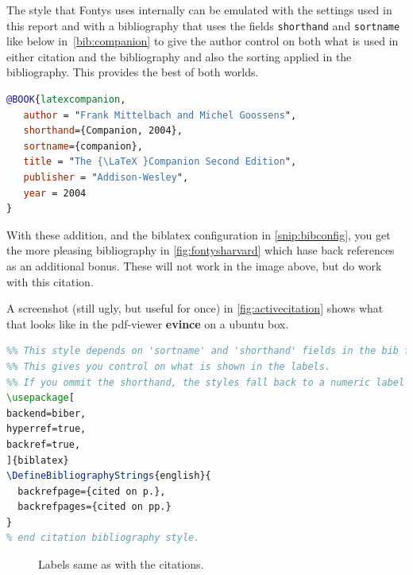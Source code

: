 The style that Fontys uses internally can be emulated with the
settings used in this report and with a bibliography that uses the
fields \texttt{shorthand} and \texttt{sortname} like below
in~\vref{bib:companion} to give the author control on both what is
used in either citation and the bibliography and also the sorting
applied in the bibliography. This provides the best of both worlds.

\begin{lstlisting}[language=BibTeX,caption={\label{bib:companion}Using \texttt{shorthand} for label and \texttt{sortname}for sorting}]
  @BOOK{latexcompanion,
   author = "Frank Mittelbach and Michel Goossens",
   shorthand={Companion, 2004},
   sortname={companion},
   title = "The {\LaTeX }Companion Second Edition",
   publisher = "Addison-Wesley",
   year = 2004
}
\end{lstlisting}

With these addition, and the biblatex configuration in \vref{snip:bibconfig}, you get the more pleasing bibliography in \vref{fig:fontysharvard}
which hase back references as an additional bonus. These will not work in the image above, but do work with this \textcite{latexcompanion} citation.

A screenshot (still ugly, but useful for once) in \vref{fig:activecitation} shows what that looks like in the pdf-viewer \textbf{evince} on a ubuntu box.

\begin{lstlisting}[language=TeX,caption={\label{snip:bibconfig}Using \texttt{shorthand} for label and \texttt{sortname}for sorting}]
%% citation and bibliography style.
%% This style depends on 'sortname' and 'shorthand' fields in the bib file.
%% This gives you control on what is shown in the labels.
%% If you ommit the shorthand, the styles fall back to a numeric label
\usepackage[
backend=biber,
hyperref=true,
backref=true,
]{biblatex}
\DefineBibliographyStrings{english}{
  backrefpage={cited on p.},
  backrefpages={cited on pp.}
}
% end citation bibliography style.
\end{lstlisting}

\begin{figure}
  \caption{\label{fig:fontysharvard}Labels same as with the citations.}
\end{figure}



